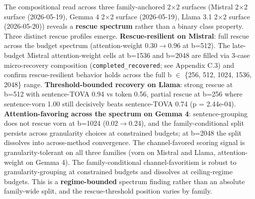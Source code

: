\documentclass[10pt]{article}
\begin{document}
The compositional read across three family-anchored 2$\times$2 surfaces
(Mistral 2$\times$2 surface (2026-05-19), Gemma 4 2$\times$2 surface (2026-05-19),
Llama 3.1 2$\times$2 surface (2026-05-20)) reveals a \textbf{rescue spectrum}
rather than a binary class property. Three distinct rescue profiles
emerge. \textbf{Rescue-resilient on Mistral}: full rescue across the budget
spectrum (attention-weight 0.30$\rightarrow$0.96 at b=512). The late-budget Mistral
attention-weight cells at b=1536 and b=2048 are filled via 3-case
micro-recovery composition (\texttt{completed\_recovered}; see
Appendix C.3) and confirm rescue-resilient behavior holds across the
full b $\in$ \{256, 512, 1024, 1536, 2048\} range.
\textbf{Threshold-bounded recovery on Llama}: strong rescue at b=512
with sentence-TOVA 0.94 vs token 0.56, partial rescue at b=256 where
sentence-vorn 1.00 still decisively beats sentence-TOVA 0.74
(p = 2.44e-04). \textbf{Attention-favoring across the spectrum on
Gemma 4}: sentence-grouping does not rescue vorn at b=1024
(0.02$\rightarrow$0.24), and the family-conditional split persists across
granularity choices at constrained budgets; at b=2048 the split
dissolves into across-method convergence. The channel-favored
scoring signal is granularity-tolerant on all three families (vorn on
Mistral and Llama, attention-weight on Gemma 4). The family-conditional
channel-favoritism is robust to granularity-grouping at constrained
budgets and dissolves at ceiling-regime budgets. This is a
\textbf{regime-bounded} spectrum finding rather than an absolute
family-wide split, and the rescue-threshold position varies by family.
\end{document}
